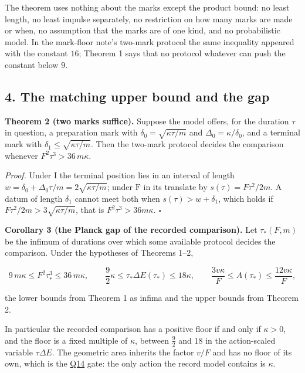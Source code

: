 \documentclass[11pt,a4paper]{article}
\begin{document}
The theorem uses nothing about the marks except the product bound: no
least length, no least impulse separately, no restriction on how many
marks are made or when, no assumption that the marks are of one kind,
and no probabilistic model. In the mark-floor note's two-mark protocol
the same inequality appeared with the constant \(16\); Theorem 1 says
that no protocol whatever can push the constant below \(9\).

\hypertarget{the-matching-upper-bound-and-the-gap}{%
\subsection{4. The matching upper bound and the
gap}\label{the-matching-upper-bound-and-the-gap}}

\textbf{Theorem 2 (two marks suffice).} Suppose the model offers, for
the duration \(\tau\) in question, a preparation mark with
\(\delta_0=\sqrt{\kappa\tau/m}\) and \(\Delta_0=\kappa/\delta_0\), and a
terminal mark with \(\delta_1\le\sqrt{\kappa\tau/m}\). Then the two-mark
protocol decides the comparison whenever \(F^2\tau^3>36\,m\kappa\).

\emph{Proof.} Under \(\mathrm I\) the terminal position lies in an
interval of length \(w=\delta_0+\Delta_0\tau/m=2\sqrt{\kappa\tau/m}\);
under \(\mathrm F\) in its translate by \(s(\tau)=F\tau^2/2m\). A datum
of length \(\delta_1\) cannot meet both when \(s(\tau)>w+\delta_1\),
which holds if \(F\tau^2/2m>3\sqrt{\kappa\tau/m}\), that is
\(F^2\tau^3>36m\kappa\). \(\square\)

\textbf{Corollary 3 (the Planck gap of the recorded comparison).} Let
\(\tau_*(F,m)\) be the infimum of durations over which some available
protocol decides the comparison. Under the hypotheses of Theorems 1--2,

\[9\,m\kappa\le F^2\tau_*^3\le36\,m\kappa,\qquad
\frac92\kappa\le\tau_*\Delta E(\tau_*)\le18\kappa,\qquad
\frac{3v\kappa}{F}\le A(\tau_*)\le\frac{12v\kappa}{F},\]

the lower bounds from Theorem 1 as infima and the upper bounds from
Theorem 2.

In particular the recorded comparison has a positive floor if and only
if \(\kappa>0\), and the floor is a fixed multiple of \(\kappa\),
between \(\tfrac92\) and \(18\) in the action-scaled variable
\(\tau\Delta E\). The geometric area inherits the factor \(v/F\) and has
no floor of its own, which is the
\href{action-unit-dimensional-selection.md}{Q14} gate: the only action
the record model contains is \(\kappa\).
\end{document}
